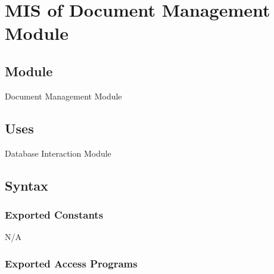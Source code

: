 \documentclass[12pt, titlepage]{article}
\begin{document}
\newpage

\section{MIS of Document Management Module} \label{Module}

\subsection{Module}

Document Management Module

\subsection{Uses}

Database Interaction Module

\subsection{Syntax}

\subsubsection{Exported Constants}
N/A

\subsubsection{Exported Access Programs}
\end{document}
